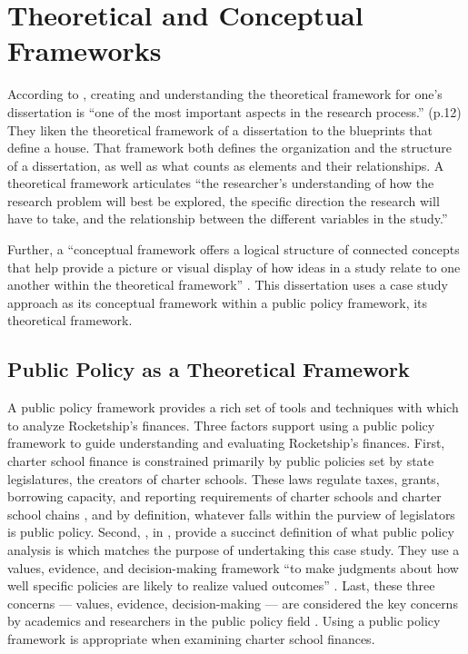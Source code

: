 \section{Theoretical and Conceptual Frameworks}\indent

According to \textcite{Grant.Osanloo2014}, creating and understanding the theoretical framework for one's dissertation is ``one of the most important aspects in the research process.'' (p.12) They liken the theoretical framework of a dissertation to the blueprints that define a house. That framework both defines the organization and the structure of a dissertation, as well as what counts as elements and their relationships. A theoretical framework articulates ``the researcher's understanding of how the research problem will best be explored, the specific direction the research will have to take, and the relationship between the different variables in the study.'' \parencite[16–17]{Grant.Osanloo2014}

Further, a ``conceptual framework offers a logical structure of connected concepts that help provide a picture or visual display of how ideas in a study relate to one another within the theoretical framework'' \parencite[16–17]{Grant.Osanloo2014}. This dissertation uses a case study approach as its conceptual framework within a public policy framework, its theoretical framework. 

\subsection{Public Policy as a Theoretical Framework}\label{subsec:PublicPolicyFramework}\indent

A public policy framework provides a rich set of tools and techniques with which to analyze Rocketship's finances. Three factors support using a public policy framework to guide understanding and evaluating Rocketship's finances. First, charter school finance is constrained primarily by public policies set by state legislatures, the creators of charter schools. These laws regulate taxes, grants, borrowing capacity, and reporting requirements of charter schools and charter school chains \parencite{Aguinaldo.etal2020}, and by definition, whatever falls within the purview of legislators is public policy. Second, \textcite{Brighouse.etal2018}, in , provide a succinct definition of what public policy analysis is which matches the purpose of undertaking this case study. They use a values, evidence, and decision-making framework ``to make judgments about how well specific policies are likely to realize valued outcomes'' \parencite[p.1]{Brighouse.etal2018}. Last, these three concerns — values, evidence, decision-making — are considered the key concerns by academics and researchers in the public policy field \parencite{BuenoDeMesquita2016, Clemons.McBeth2021,Fowler2013,Gupta2011}. Using a public policy framework is appropriate when examining charter school finances.

